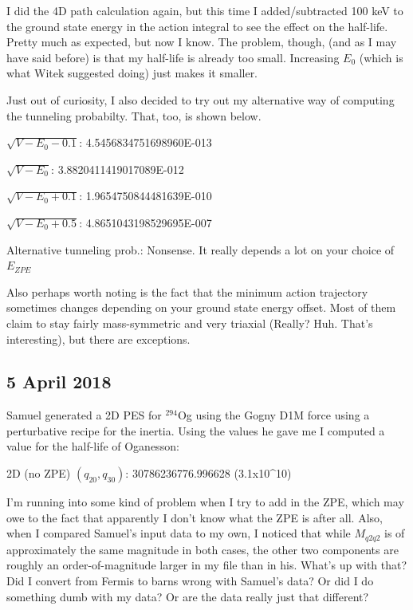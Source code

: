 \documentclass[]{report}
\begin{document}
I did the 4D path calculation again, but this time I added/subtracted 100 keV to the ground state energy in the action integral to see the effect on the half-life. Pretty much as expected, but now I know. The problem, though, (and as I may have said before) is that my half-life is already too small. Increasing $E_0$ (which is what Witek suggested doing) just makes it smaller.

Just out of curiosity, I also decided to try out my alternative way of computing the tunneling probabilty. That, too, is shown below.

\begin{list}{}{Half-lives with different ground state energies:}
\item $\sqrt{V-E_0-0.1}$:    4.5456834751698960E-013
\item $\sqrt{V-E_0}$:    3.8820411419017089E-012
\item $\sqrt{V-E_0+0.1}$:    1.9654750844481639E-010
\item $\sqrt{V-E_0+0.5}$:    4.8651043198529695E-007
\item Alternative tunneling prob.: Nonsense. It really depends a lot on your choice of $E_{ZPE}$
\end{list}

Also perhaps worth noting is the fact that the minimum action trajectory sometimes changes depending on your ground state energy offset. Most of them claim to stay fairly mass-symmetric and very triaxial (Really? Huh. That's interesting), but there are exceptions.

\subsection*{5 April 2018}
Samuel generated a 2D PES for $^{294}$Og using the Gogny D1M force using a perturbative recipe for the inertia. Using the values he gave me I computed a value for the half-life of Oganesson:

\begin{list}{}{Half-life in 2 dimensions from Gogny:}
\item 2D (no ZPE) $(q_{20},q_{30})$:        30786236776.996628 (3.1x10^10)
\end{list}

I'm running into some kind of problem when I try to add in the ZPE, which may owe to the fact that apparently I don't know what the ZPE is after all. Also, when I compared Samuel's input data to my own, I noticed that while $M_{q2q2}$ is of approximately the same magnitude in both cases, the other two components are roughly an order-of-magnitude larger in my file than in his. What's up with that? Did I convert from Fermis to barns wrong with Samuel's data? Or did I do something dumb with my data? Or are the data really just that different?
\end{document}
